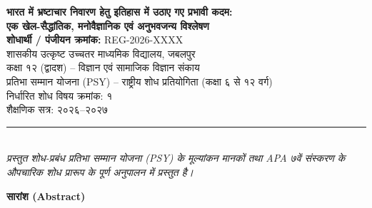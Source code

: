 \documentclass[11pt, a4paper]{article}
\begin{document}
\begin{titlepage}
    \centering
    \vspace*{1.5in}
    
    {\Large \textbf{भारत में भ्रष्टाचार निवारण हेतु इतिहास में उठाए गए प्रभावी कदम:}} \\[0.5em]
    {\large \textbf{एक खेल-सैद्धांतिक, मनोवैज्ञानिक एवं अनुभवजन्य विश्लेषण}} \\[2.5\baselineskip]
    
    {\normalsize \textbf{शोधार्थी / पंजीयन क्रमांक:} REG-2026-XXXX} \\[0.4em]
    {\normalsize शासकीय उत्कृष्ट उच्चतर माध्यमिक विद्यालय, जबलपुर} \\[0.4em]
    {\normalsize कक्षा १२ (द्वादश) -- विज्ञान एवं सामाजिक विज्ञान संकाय} \\[2.5\baselineskip]
    
    {\normalsize प्रतिभा सम्मान योजना (PSY) -- राष्ट्रीय शोध प्रतियोगिता (कक्षा ६ से १२ वर्ग)} \\[0.4em]
    {\normalsize निर्धारित शोध विषय क्रमांक: १} \\[0.4em]
    {\normalsize शैक्षणिक सत्र: २०२६--२०२७}
    
    \vfill
    \noindent \rule{0.6\textwidth}{0.4pt} \\[0.5em]
    {\footnotesize \textit{प्रस्तुत शोध-प्रबंध प्रतिभा सम्मान योजना (PSY) के मूल्यांकन मानकों तथा APA ७वें संस्करण के औपचारिक शोध प्रारूप के पूर्ण अनुपालन में प्रस्तुत है।}}
    \vspace*{0.5in}
\end{titlepage}

\newpage
\begin{center}
    \textbf{सारांश (Abstract)}
\end{center}
\end{document}
